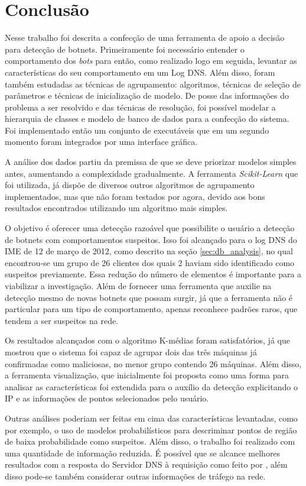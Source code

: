 \chapter{Conclusão}

Nesse trabalho foi descrita a confecção de uma ferramenta de apoio a decisão para detecção de botnets. Primeiramente foi necessário entender o comportamento dos \textit{bots} para então, como realizado logo em seguida, levantar as características do seu comportamento em um Log DNS. Além disso, foram também estudadas as técnicas de agrupamento: algoritmos, técnicas de seleção de parâmetros e técnicas de inicialização de modelo. De posse das informações do problema a ser resolvido e das técnicas de resolução, foi possível modelar a hierarquia de classes e modelo de banco de dados para a confecção do sistema. Foi implementado então um conjunto de executáveis que em um segundo momento foram integrados por uma interface gráfica.

A análise dos dados partiu da premissa de que se deve priorizar modelos simples antes, aumentando a complexidade gradualmente. A ferramenta \textit{Scikit-Learn} que foi utilizada, já dispõe de diversos outros algoritmos de agrupamento implementados, mas que não foram testados por agora, devido aos bons resultados encontrados utilizando um algoritmo mais simples.

O objetivo é oferecer uma detecção razoável que possibilite o usuário a detecção de botnets com comportamentos suspeitos. Isso foi alcançado para o log DNS do IME de 12 de março de 2012, como descrito na seção \ref{sec:db_analysis}, no qual encontrou-se um grupo de 26 clientes dos quais 2 haviam sido identificado como suspeitos previamente. Essa redução do número de elementos é importante para a viabilizar a investigação. Além de fornecer uma ferramenta que auxilie na detecção mesmo de novas botnets que possam surgir, já que a ferramenta não é particular para um tipo de comportamento, apenas reconhece padrões raros, que tendem a ser suspeitos na rede.

Os resultados alcançados com o algoritmo K-médias foram satisfatórios, já que mostrou que o sistema foi capaz de agrupar dois das três máquinas já confirmadas como maliciosas, no menor grupo contendo 26 máquinas. Além disso, a ferramenta visualização, que inicialmente foi proposta como uma forma para analisar as características foi extendida para o auxílio da detecção explicitando o IP e as informações de pontos selecionados pelo usuário.

Outras análises poderiam ser feitas em cima das características levantadas, como por exemplo, o uso de modelos probabilísticos para descriminar pontos de região de baixa probabilidade como suspeitos. Além disso, o trabalho foi realizado com uma quantidade de informação reduzida. É possível que se alcance melhores resultados com a resposta do Servidor DNS à requisição como feito por \citet{schonewille2006domain}, além disso pode-se também considerar outras informações de tráfego na rede.	